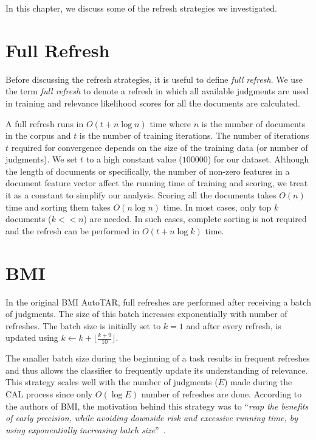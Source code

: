 \label{chap:refresh}
In this chapter, we discuss some of the refresh strategies we investigated.

\section{Full Refresh}
Before discussing the refresh strategies, it is useful to define \textit{full
refresh}. We use the term \textit{full refresh} to denote a refresh in which all
available judgments are used in training and relevance likelihood scores for all
the documents are calculated.

A full refresh runs in $O(t + n\log n)$ time where $n$ is the number of
documents in the corpus and $t$ is the number of training iterations. The number
of iterations $t$ required for convergence depends on the size of the training data
(or number of judgments). We set $t$ to a high constant value ($100000$) for our
dataset. Although the length of documents or specifically, the number of
non-zero features in a document feature vector affect the running time of training
and scoring, we treat it as a constant to simplify our analysis. Scoring all the
documents takes $O(n)$ time and sorting them takes $O(n \log n)$ time. In most
cases, only top $k$ documents ($k<<n$) are needed. In such cases, complete
sorting is not required and the refresh can be performed in $O(t + n \log k)$
time.

\section{BMI}

In the original BMI AutoTAR, full refreshes are performed after receiving a
batch of judgments. The size of this batch increases exponentially with number
of refreshes. The batch size is initially set to $k=1$ and after every refresh,
is updated using $k \leftarrow k + \lfloor\frac{k + 9}{10}\rfloor$.

The smaller batch size during the beginning of a task results in frequent
refreshes and thus allows the classifier to frequently update its understanding
of relevance. This strategy scales well with the number of judgments ($E$) made
during the CAL process since only $O(\log E)$ number of refreshes are done.
According to the authors of BMI, the motivation behind this strategy was to
``\textit{reap the benefits of early precision, while avoiding downside risk and
    excessive running time, by using exponentially increasing batch
size}''~\cite{cormack2015autonomy}.

